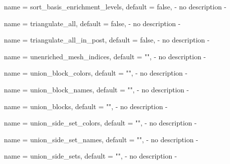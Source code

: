 \begin{parameter}{
    name    = {sort_basis_enrichment_levels},
    default = {false},
}
- no description -
\end{parameter}

\begin{parameter}{
    name    = {triangulate_all},
    default = {false},
}
- no description -
\end{parameter}

\begin{parameter}{
    name    = {triangulate_all_in_post},
    default = {false},
}
- no description -
\end{parameter}

\begin{parameter}{
    name    = {unenriched_mesh_indices},
    default = {""},
}
- no description -
\end{parameter}

\begin{parameter}{
    name    = {union_block_colors},
    default = {""},
}
- no description -
\end{parameter}

\begin{parameter}{
    name    = {union_block_names},
    default = {""},
}
- no description -
\end{parameter}

\begin{parameter}{
    name    = {union_blocks},
    default = {""},
}
- no description -
\end{parameter}

\begin{parameter}{
    name    = {union_side_set_colors},
    default = {""},
}
- no description -
\end{parameter}

\begin{parameter}{
    name    = {union_side_set_names},
    default = {""},
}
- no description -
\end{parameter}

\begin{parameter}{
    name    = {union_side_sets},
    default = {""},
}
- no description -
\end{parameter}

